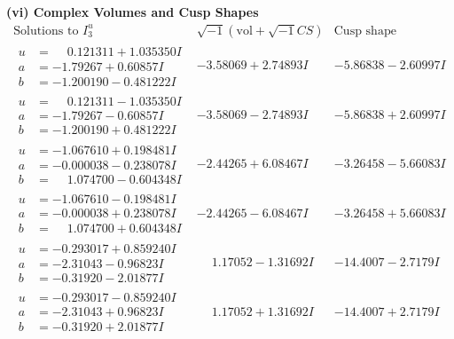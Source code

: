 \documentclass[1p]{elsarticle_modified}
\theoremstyle{definition}
\newcommand{\I}{\sqrt{-1}}
\begin{document}
\newpage\flushleft \textbf{(vi) Complex Volumes and Cusp Shapes}
$$\begin{array}{c|c|c}  
\text{Solutions to }I^u_{3}& \I (\text{vol} + \sqrt{-1}CS) & \text{Cusp shape}\\
 \hline 
\begin{aligned}
u &= \phantom{-}0.121311 + 1.035350 I \\
a &= -1.79267 + 0.60857 I \\
b &= -1.200190 - 0.481222 I\end{aligned}
 & -3.58069 + 2.74893 I & -5.86838 - 2.60997 I \\ \hline\begin{aligned}
u &= \phantom{-}0.121311 - 1.035350 I \\
a &= -1.79267 - 0.60857 I \\
b &= -1.200190 + 0.481222 I\end{aligned}
 & -3.58069 - 2.74893 I & -5.86838 + 2.60997 I \\ \hline\begin{aligned}
u &= -1.067610 + 0.198481 I \\
a &= -0.000038 - 0.238078 I \\
b &= \phantom{-}1.074700 - 0.604348 I\end{aligned}
 & -2.44265 + 6.08467 I & -3.26458 - 5.66083 I \\ \hline\begin{aligned}
u &= -1.067610 - 0.198481 I \\
a &= -0.000038 + 0.238078 I \\
b &= \phantom{-}1.074700 + 0.604348 I\end{aligned}
 & -2.44265 - 6.08467 I & -3.26458 + 5.66083 I \\ \hline\begin{aligned}
u &= -0.293017 + 0.859240 I \\
a &= -2.31043 - 0.96823 I \\
b &= -0.31920 - 2.01877 I\end{aligned}
 & \phantom{-}1.17052 - 1.31692 I & -14.4007 - 2.7179 I \\ \hline\begin{aligned}
u &= -0.293017 - 0.859240 I \\
a &= -2.31043 + 0.96823 I \\
b &= -0.31920 + 2.01877 I\end{aligned}
 & \phantom{-}1.17052 + 1.31692 I & -14.4007 + 2.7179 I \\ \hline\begin{aligned}

\end{aligned}
\end{array}$$
\end{document}

